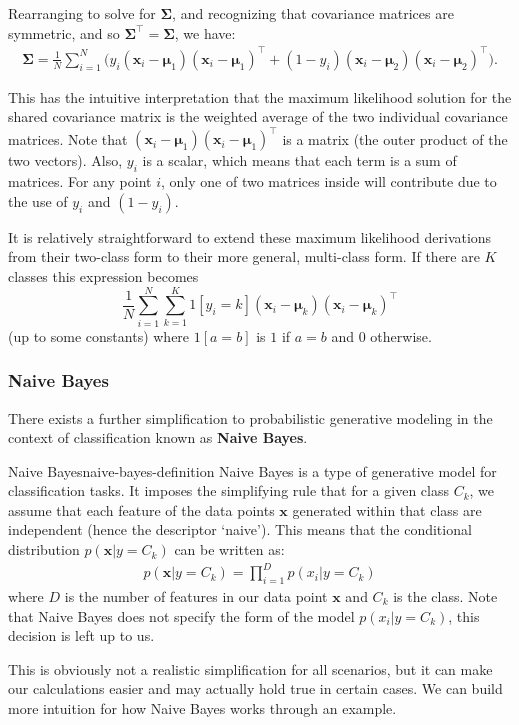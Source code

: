 Rearranging to solve for $\boldsymbol{\Sigma}$, and recognizing that covariance matrices are symmetric, and so
$	\boldsymbol{\Sigma}^\top = 	\boldsymbol{\Sigma}$, 
we have:
%
\begin{align*}
	\boldsymbol{\Sigma} = \frac{1}{N} \sum_{i=1}^{N} \bigg( y_{i}(\textbf{x}_{i} - \boldsymbol{\mu}_{1})(\textbf{x}_{i} - \boldsymbol{\mu}_{1})^\top + (1-y_{i})(\textbf{x}_{i} - \boldsymbol{\mu}_{2})(\textbf{x}_{i} - \boldsymbol{\mu}_{2})^\top \bigg).
\end{align*}


This has the intuitive interpretation that the maximum likelihood solution for the shared covariance matrix is the weighted average of the two individual covariance matrices.
Note that $(\mathbf{x}_i - \boldsymbol{\mu}_1)(\mathbf{x}_i - \boldsymbol{\mu}_1)^\top$ is a matrix (the outer product of the two vectors). Also, $y_i$ is a scalar, which means that each term is a sum of matrices. For any point $i$, only one of two matrices inside will contribute due to the use  of $y_i$ and $(1-y_i)$.
\newline

It is relatively straightforward to extend these maximum likelihood derivations from their two-class form to their more general, multi-class form.
%
%
If there are $K$ classes this expression becomes
%
$$\frac{1}{N} \sum_{i=1}^N \sum_{k=1}^K 1[y_i=k](\mathbf{x}_i - \boldsymbol{\mu}_k)(\mathbf{x}_i - \boldsymbol{\mu}_k)^\top  $$
%
(up to some constants) where $1[a=b]$ is $1$ if $a=b$ and $0$ otherwise.
\fi



\subsubsection{Naive Bayes}
There exists a further simplification to probabilistic generative modeling in the context of classification known as \textbf{Naive Bayes}.

\begin{definition}{Naive Bayes}{naive-bayes-definition}
	Naive Bayes is a type of generative model for classification tasks. It imposes the simplifying rule that for a given class $C_{k}$, we assume that each feature of the data points $\textbf{x}$ generated within that class are independent (hence the descriptor `naive'). This means that the conditional distribution $p(\textbf{x} | y = C_{k})$ can be written as:
	\begin{align*}
		p(\textbf{x} | y = C_{k}) = \prod_{i = 1}^{D} p(x_{i} | y = C_{k})
	\end{align*}
	where $D$ is the number of features in our data point $\textbf{x}$ and $C_{k}$ is the class. Note that Naive Bayes does not specify the form of the model $p(x_{i} | y = C_{k})$, this decision is left up to us.
\end{definition}
This is obviously not a realistic simplification for all scenarios, but it can make our calculations easier and may actually hold true in certain cases. We can build more intuition for how Naive Bayes works through an example.

